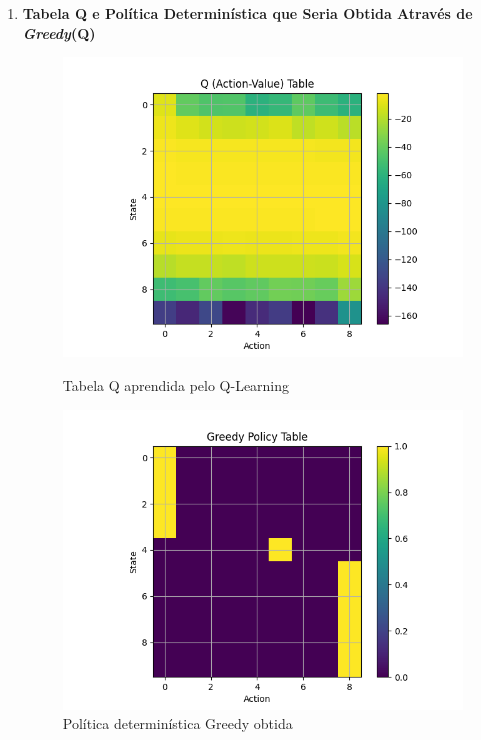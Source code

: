 \documentclass[a4paper,12pt]{article}
\begin{document}
\begin{enumerate}[label=2.2.\arabic*.]
\begin{figure}[!h]
    \end{figure}

    \newpage
    
    \item \textbf{Tabela Q e Política Determinística que Seria Obtida Através de \textit{Greedy}(Q)}\\
    \begin{figure}[h!]
      \centering
      \begin{minipage}{0.5\textwidth}
        \centering
        \includegraphics[width=\textwidth]{q-learning/action_value_table.png}
        \caption{Tabela Q aprendida pelo Q-Learning}

      \end{minipage}\hfill
      \begin{minipage}{0.5\textwidth}
        \centering
        \includegraphics[width=\textwidth]{q-learning/greedy_policy_table.png}
        \caption{Política determinística Greedy obtida}


\end{minipage}
\end{figure}
\end{enumerate}
\end{document}
